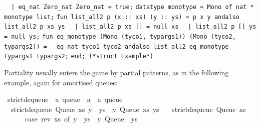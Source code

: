 \begin{isabellebody}
\begin{isamarkuptext}
\verb|  |\verb,|,\verb| eq_nat Zero_nat Zero_nat = true;|\newline%
\newline%
\verb|datatype monotype = Mono of nat * monotype list;|\newline%
\newline%
\verb|fun list_all2 p (x :: xs) (y :: ys) = p x y andalso list_all2 p xs ys|\newline%
\verb|  |\verb,|,\verb| list_all2 p xs [] = null xs|\newline%
\verb|  |\verb,|,\verb| list_all2 p [] ys = null ys;|\newline%
\newline%
\verb|fun eq_monotype (Mono (tyco1, typargs1)) (Mono (tyco2, typargs2)) =|\newline%
\verb|  eq_nat tyco1 tyco2 andalso list_all2 eq_monotype typargs1 typargs2;|\newline%
\newline%
\verb|end; (*struct Example*)|%
\end{isamarkuptext}%
\isamarkuptrue%
%
\endisatagquote
{\isafoldquote}%
%
\isadelimquote
%
\endisadelimquote
%
\isamarkuptrue%
%
\begin{isamarkuptext}%
Partiality usually enters the game by partial patterns, as
  in the following example, again for amortised queues:%
\end{isamarkuptext}%
\isamarkuptrue%
%
\isadelimquote
%
\endisadelimquote
%
\isatagquote
{}\isamarkupfalse%
\ strict{\isacharunderscore}dequeue\ {\isacharcolon}{\isacharcolon}\ {\isachardoublequoteopen}{\isacharprime}a\ queue\ {\isasymRightarrow}\ {\isacharprime}a\ {\isasymtimes}\ {\isacharprime}a\ queue{\isachardoublequoteclose}\ \isanewline
\ \ {\isachardoublequoteopen}strict{\isacharunderscore}dequeue\ {\isacharparenleft}Queue\ xs\ {\isacharparenleft}y\ {\isacharhash}\ ys{\isacharparenright}{\isacharparenright}\ {\isacharequal}\ {\isacharparenleft}y{\isacharcomma}\ Queue\ xs\ ys{\isacharparenright}{\isachardoublequoteclose}\isanewline
\ \ {\isacharbar}\ {\isachardoublequoteopen}strict{\isacharunderscore}dequeue\ {\isacharparenleft}Queue\ xs\ {\isacharbrackleft}{\isacharbrackright}{\isacharparenright}\ {\isacharequal}\isanewline
\ \ \ \ \ \ {\isacharparenleft}case\ rev\ xs\ of\ y\ {\isacharhash}\ ys\ {\isasymRightarrow}\ {\isacharparenleft}y{\isacharcomma}\ Queue\ {\isacharbrackleft}{\isacharbrackright}\ ys{\isacharparenright}{\isacharparenright}{\isachardoublequoteclose}%
\endisatagquote
{\isafoldquote}%

\end{isabellebody}
